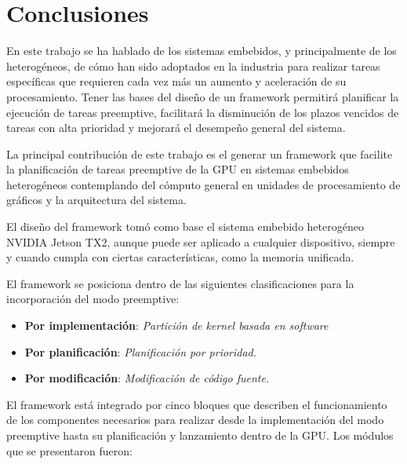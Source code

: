 \chapter{Conclusiones}
    \label{cha:Conclusiones}
    
En este trabajo se ha hablado de los sistemas embebidos, y principalmente de los heterogéneos, de cómo han sido adoptados en la industria para realizar tareas específicas que requieren cada vez más un aumento y aceleración de su procesamiento.
Tener las bases del diseño de un framework permitirá planificar la ejecución de tareas preemptive, facilitará la disminución de los plazos vencidos de tareas con alta prioridad y mejorará el desempeño general del sistema.
\newline

La principal contribución de este trabajo es el generar un framework que facilite la planificación de tareas preemptive de la GPU en sistemas embebidos heterogéneos contemplando del cómputo general en unidades de procesamiento de gráficos y la arquitectura del sistema.
\newline

El diseño del framework tomó como base el sistema embebido heterogéneo NVIDIA Jetson TX2, aunque puede ser aplicado a cualquier dispositivo, siempre y cuando cumpla con ciertas características, como la memoria unificada.
\newline

El framework se posiciona dentro de las siguientes clasificaciones para la incorporación del modo preemptive:
\begin{itemize}
    \item \textbf{Por implementación}: \textit{Partición de kernel basada en software}
    \item \textbf{Por planificación}: \textit{Planificación por prioridad.}
    \item \textbf{Por modificación}: \textit{Modificación de código fuente.}
\end{itemize}
    
El framework está integrado por cinco bloques que describen el funcionamiento de los componentes necesarios para realizar desde la implementación del modo preemptive hasta su planificación y lanzamiento dentro de la GPU. 
Los módulos que se presentaron fueron:

